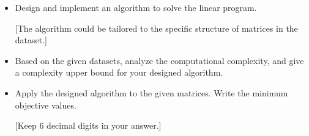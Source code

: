\begin{enumerate}
\begin{itemize}
    \item[(2) (20 pt)] Design and implement an algorithm to solve the linear program. 

    [The algorithm could be tailored to the specific structure of matrices in the dataset.]

    \item[(3) (5 pt)] Based on the given datasets, analyze the computational complexity, and give a complexity upper bound for your designed algorithm. 

    \item[(4) (15 pt)]  Apply the designed algorithm to the given matrices. Write the minimum objective values. 

    [Keep 6 decimal digits in your answer.]

\end{itemize}



\end{enumerate}